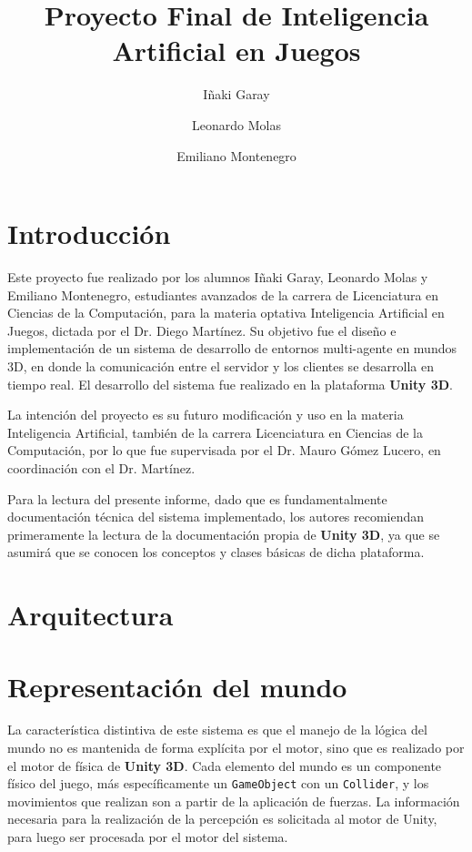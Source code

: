 \documentclass[a4paper,oneside]{article}
\title{Proyecto Final de Inteligencia Artificial en Juegos}
\author{Iñaki Garay \and Leonardo Molas \and Emiliano Montenegro}
\begin{document}
\maketitle

\section{Introducción}

Este proyecto fue realizado por los alumnos Iñaki Garay, Leonardo Molas y Emiliano Montenegro, estudiantes avanzados de la carrera de Licenciatura en Ciencias de la
Computación, para la materia optativa Inteligencia Artificial en Juegos, dictada por el 
Dr. Diego Martínez. Su objetivo fue el diseño e implementación de un sistema de 
desarrollo de entornos multi-agente en mundos 3D, en donde la comunicación entre el 
servidor y los clientes se desarrolla en tiempo real. El desarrollo del sistema fue 
realizado en la plataforma \textbf{Unity 3D}.

La intención del proyecto es su futuro modificación y uso en la materia Inteligencia 
Artificial, también de la carrera Licenciatura en Ciencias de la Computación, por lo que 
fue supervisada por el Dr. Mauro Gómez Lucero, en coordinación con el Dr. Martínez.

Para la lectura del presente informe, dado que es fundamentalmente documentación 
técnica del sistema implementado, los autores recomiendan primeramente la lectura de la
documentación propia de \textbf{Unity 3D}, ya que se asumirá que se conocen los 
conceptos y clases básicas de dicha plataforma.

\section{Arquitectura}


\section{Representación del mundo} 

La característica distintiva de este sistema es que el manejo de la lógica del mundo no es mantenida de forma explícita por el motor, sino que es realizado por el motor de física de \textbf{Unity 3D}. Cada elemento del mundo es un componente físico del juego,
más específicamente un \texttt{GameObject} con un \texttt{Collider}, y los movimientos que realizan son a partir de la aplicación de fuerzas. La información necesaria para la
realización de la percepción es solicitada al motor de Unity, para luego ser procesada 
por el motor del sistema.
\end{document}
